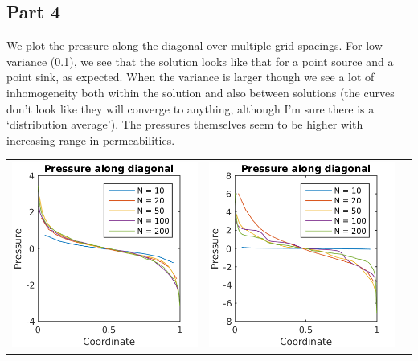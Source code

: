 \documentclass{article}
\begin{document}
\subsection{Part 4}
We plot the pressure along the diagonal over multiple grid spacings.
For low variance (0.1), we see that the solution looks like that for a point source and a point sink, as expected.
When the variance is larger though we see a lot of inhomogeneity both within the solution and also between solutions (the curves don't look like they will converge to anything, although I'm sure there is a `distribution average'). The pressures themselves seem to be higher with increasing range in permeabilities.
\begin{table}[!h]
\centering
\begin{tabular}{c c c}
\includegraphics[scale=0.75]{figs/pressure_1.png} &
\includegraphics[scale=0.75]{figs/pressure_20.png} &

\end{tabular}
\end{table}
\end{document}
